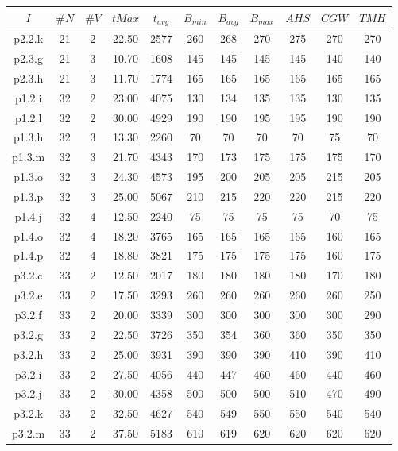\begin{center}
\begin{tabular}{ |c|c|c|c|c|c|c|c|c|c|c| } 
\hline
$I$ & $\#N$ & $\#V$ & $tMax$ & $t_{avg}$ & $B_{min}$ & $B_{avg}$ & $B_{max}$ & $AHS$ & $CGW$ & $TMH$\\
\hline
p2.2.k & 21 & 2 & 22.50 & 2577 & 260 & 268 & 270 & 275 & 270 & 270  \\
p2.3.g & 21 & 3 & 10.70 & 1608 & 145 & 145 & 145 & 145 & 140 & 140  \\
p2.3.h & 21 & 3 & 11.70 & 1774 & 165 & 165 & 165 & 165 & 165 & 165  \\
p1.2.i & 32 & 2 & 23.00 & 4075 & 130 & 134 & 135 & 135 & 130 & 135  \\
p1.2.l & 32 & 2 & 30.00 & 4929 & 190 & 190 & 195 & 195 & 190 & 190  \\
p1.3.h & 32 & 3 & 13.30 & 2260 & 70 & 70 & 70 & 70 & 75 & 70  \\
p1.3.m & 32 & 3 & 21.70 & 4343 & 170 & 173 & 175 & 175 & 175 & 170  \\
p1.3.o & 32 & 3 & 24.30 & 4573 & 195 & 200 & 205 & 205 & 215 & 205  \\
p1.3.p & 32 & 3 & 25.00 & 5067 & 210 & 215 & 220 & 220 & 215 & 220  \\
p1.4.j & 32 & 4 & 12.50 & 2240 & 75 & 75 & 75 & 75 & 70 & 75  \\
p1.4.o & 32 & 4 & 18.20 & 3765 & 165 & 165 & 165 & 165 & 160 & 165  \\
p1.4.p & 32 & 4 & 18.80 & 3821 & 175 & 175 & 175 & 175 & 160 & 175  \\
p3.2.c & 33 & 2 & 12.50 & 2017 & 180 & 180 & 180 & 180 & 170 & 180  \\
p3.2.e & 33 & 2 & 17.50 & 3293 & 260 & 260 & 260 & 260 & 260 & 250  \\
p3.2.f & 33 & 2 & 20.00 & 3339 & 300 & 300 & 300 & 300 & 300 & 290  \\
p3.2.g & 33 & 2 & 22.50 & 3726 & 350 & 354 & 360 & 360 & 350 & 350  \\
p3.2.h & 33 & 2 & 25.00 & 3931 & 390 & 390 & 390 & 410 & 390 & 410  \\
p3.2.i & 33 & 2 & 27.50 & 4056 & 440 & 447 & 460 & 460 & 440 & 460  \\
p3.2.j & 33 & 2 & 30.00 & 4358 & 500 & 500 & 500 & 510 & 470 & 490  \\
p3.2.k & 33 & 2 & 32.50 & 4627 & 540 & 549 & 550 & 550 & 540 & 540  \\
p3.2.m & 33 & 2 & 37.50 & 5183 & 610 & 619 & 620 & 620 & 620 & 620  \\

\end{tabular}
\end{center}
